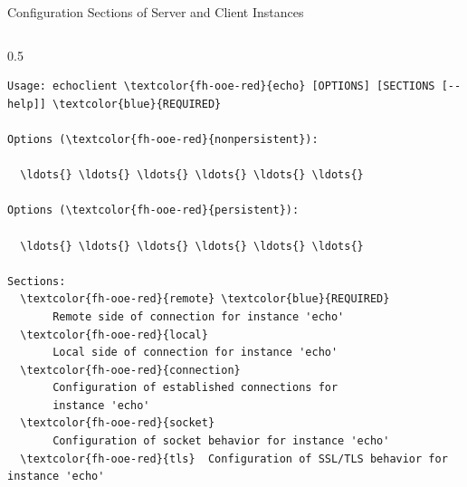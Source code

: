 \begin{frame}[fragile]{Configuration Sections of Server and Client Instances}
\begin{columns}[T, onlytextwidth]
\begin{column}{0.5\textwidth}
\begin{scriptsize}
\begin{Verbatim}[commandchars=\\\{\},frame=leftline,rulecolor=\color{fh-ooe-red}]
Usage: echoclient \textcolor{fh-ooe-red}{echo} [OPTIONS] [SECTIONS [--help]] \textcolor{blue}{REQUIRED}

Options (\textcolor{fh-ooe-red}{nonpersistent}):

  \ldots{} \ldots{} \ldots{} \ldots{} \ldots{} \ldots{}

Options (\textcolor{fh-ooe-red}{persistent}):

  \ldots{} \ldots{} \ldots{} \ldots{} \ldots{} \ldots{}

Sections:
  \textcolor{fh-ooe-red}{remote} \textcolor{blue}{REQUIRED}
       Remote side of connection for instance 'echo'
  \textcolor{fh-ooe-red}{local}
       Local side of connection for instance 'echo'
  \textcolor{fh-ooe-red}{connection}
       Configuration of established connections for
       instance 'echo'
  \textcolor{fh-ooe-red}{socket}
       Configuration of socket behavior for instance 'echo'
  \textcolor{fh-ooe-red}{tls}  Configuration of SSL/TLS behavior for instance 'echo'
\end{Verbatim}
\end{scriptsize}
\end{column}
\end{columns}
\end{frame}
